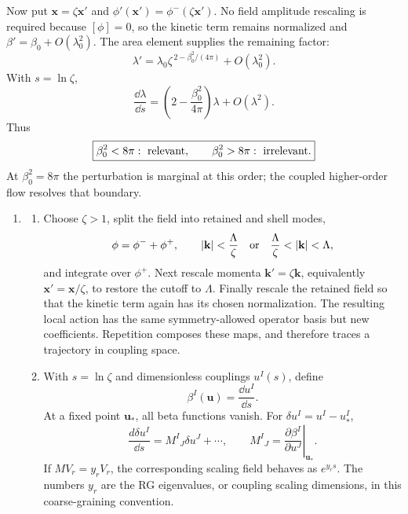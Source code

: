 \begin{enumerate}
\begin{enumerate}
    Now put \(\mathbf x=\zeta\mathbf x'\) and
    \(\phi'(\mathbf x')=\phi^-(\zeta\mathbf x')\).  No field amplitude
    rescaling is required because \([\phi]=0\), so the kinetic term remains
    normalized and \(\beta'=\beta_0+O(\lambda_0^2)\).  The area element
    supplies the remaining factor:
    \[
      \lambda'=\lambda_0
        \zeta^{\,2-\beta_0^2/(4\pi)}+O(\lambda_0^2).
    \]
    With \(s=\ln\zeta\),
    \[
      \frac{\dd\lambda}{\dd s}
      =\left(2-\frac{\beta_0^2}{4\pi}\right)\lambda+O(\lambda^2).
      \tag{18.1.S4}
    \]
    Thus
    \[
      \boxed{\beta_0^2<8\pi:\ \hbox{relevant},
      \qquad
      \beta_0^2>8\pi:\ \hbox{irrelevant}.}
    \]
    At \(\beta_0^2=8\pi\) the perturbation is marginal at this order; the
    coupled higher-order flow resolves that boundary.
  \end{enumerate}

  \begin{enumerate}
    \item[(a)]
    \begin{enumerate}
      \item[(i)] Choose \(\zeta>1\), split the field into retained and shell
      modes,
      \[
        \phi=\phi^-+\phi^+,
        \qquad
        |\mathbf k|<\frac{\Lambda}{\zeta}\quad\hbox{or}\quad
        \frac{\Lambda}{\zeta}<|\mathbf k|<\Lambda,
      \]
      and integrate over \(\phi^+\).  Next rescale momenta
      \(\mathbf k'=\zeta\mathbf k\), equivalently
      \(\mathbf x'=\mathbf x/\zeta\), to restore the cutoff to
      \(\Lambda\).  Finally rescale the retained field so that the kinetic
      term again has its chosen normalization.  The resulting local action
      has the same symmetry-allowed operator basis but new coefficients.
      Repetition composes these maps, and therefore traces a trajectory in
      coupling space.

      \item[(ii)] With \(s=\ln\zeta\) and dimensionless couplings
      \(u^I(s)\), define
      \[
        \beta^I(\mathbf u)=\frac{\dd u^I}{\dd s}.
      \]
      At a fixed point \(\mathbf u_*\), all beta functions vanish.  For
      \(\delta u^I=u^I-u_*^I\),
      \[
        \frac{d\delta u^I}{\dd s}=M^I{}_{J}\delta u^J+\cdots,
        \qquad
        M^I{}_{J}=\left.
          \frac{\partial\beta^I}{\partial u^J}\right|_{\mathbf u_*}.
      \]
      If \(M V_r=y_rV_r\), the corresponding scaling field behaves as
      \(e^{y_rs}\).  The numbers \(y_r\) are the RG eigenvalues, or
      coupling scaling dimensions, in this coarse-graining convention.


\end{enumerate}
\end{enumerate}
\end{enumerate}
